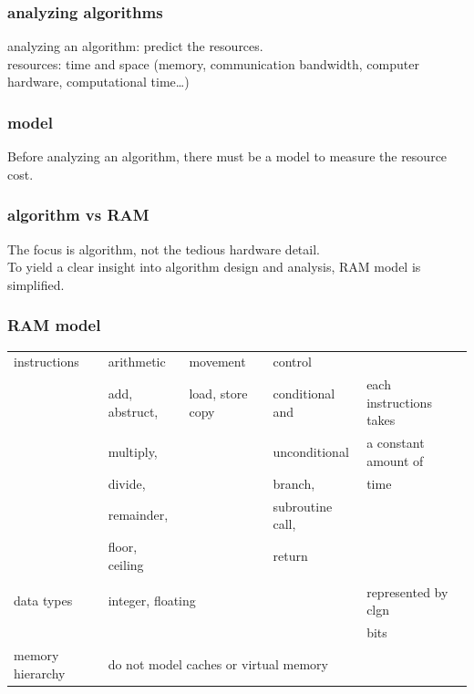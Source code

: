\documentclass[11pt]{article}
\begin{document}
\subsubsection{analyzing algorithms}
\label{sec-2-2-3}
analyzing an algorithm: predict the resources. \\
resources: time and space (memory, communication bandwidth, computer hardware, computational time\ldots{}) \\

\subsubsection{model}
\label{sec-2-2-4}
Before analyzing an algorithm, there must be a model to measure the resource cost. \\

\subsubsection{algorithm vs RAM}
\label{sec-2-2-5}
The focus is algorithm, not the tedious hardware detail. \\
To yield a clear insight into algorithm design and analysis, RAM model is simplified. \\

\subsubsection{RAM model}
\label{sec-2-2-6}
\begin{center}
\begin{tabular}{|l|l|l|l|l|}
\hline
instructions & arithmetic & movement & control & \\
\cline{2-4}
 & add, abstruct, & load, store copy & conditional and & each instructions takes \\
 & multiply, & & unconditional & a constant amount of \\
 & divide, & & branch, & time \\
 & remainder, & & subroutine call, & \\
 & floor, ceiling & & return & \\
 & & & & \\
\hline
data types & \multicolumn{3}{l|}{integer, floating} & represented by clgn \\
 & \multicolumn{3}{l|}{} & bits \\
\hline
memory hierarchy & \multicolumn{3}{l|}{do not model caches or virtual memory} & \\
\hline
\end{tabular}
\end{center}
\end{document}

